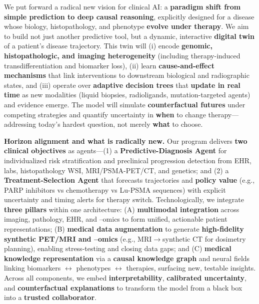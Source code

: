 \documentclass[11pt, a4paper]{article}
\begin{document}
We put forward a radical new vision for clinical AI: a \textbf{paradigm shift from simple prediction to deep causal reasoning}, explicitly designed for a disease whose biology, histopathology, and phenotype \textbf{evolve under therapy}. We aim to build not just another predictive tool, but a dynamic, interactive \textbf{digital twin} of a patient’s disease trajectory. This twin will (i) encode \textbf{genomic, histopathologic, and imaging heterogeneity} (including therapy-induced transdifferentiation and biomarker loss), (ii) learn \textbf{cause-and-effect mechanisms} that link interventions to downstream biological and radiographic states, and (iii) operate over \textbf{adaptive decision trees} that \textbf{update in real time} as new modalities (liquid biopsies, radioligands, mutation-targeted agents) and evidence emerge. The model will simulate \textbf{counterfactual futures} under competing strategies and quantify uncertainty in \textbf{when} to change therapy—addressing today’s hardest question, not merely \textbf{what} to choose.

\textbf{Horizon alignment and what is radically new.} Our program delivers \textbf{two clinical objectives} as agents—(1) a \textbf{Predictive-Diagnosis Agent} for individualized risk stratification and preclinical progression detection from EHR, labs, histopathology WSI, MRI/PSMA-PET/CT, and genetics; and (2) a \textbf{Treatment-Selection Agent} that forecasts trajectories and \textbf{policy value} (e.g., PARP inhibitors vs chemotherapy vs Lu-PSMA sequences) with explicit uncertainty and timing alerts for therapy switch. Technologically, we integrate \textbf{three pillars} within one architecture: (A) \textbf{multimodal integration} across imaging, pathology, EHR, and –omics to form unified, actionable patient representations; (B) \textbf{medical data augmentation} to generate \textbf{high-fidelity synthetic PET/MRI and –omics} (e.g., MRI$\rightarrow$synthetic CT for dosimetry planning), enabling stress-testing and closing data gaps; and (C) \textbf{medical knowledge representation} via a \textbf{causal knowledge graph} and neural fields linking biomarkers $\leftrightarrow$ phenotypes $\leftrightarrow$ therapies, surfacing new, testable insights. Across all components, we embed \textbf{interpretability}, \textbf{calibrated uncertainty}, and \textbf{counterfactual explanations} to transform the model from a black box into a \textbf{trusted collaborator}.
\end{document}
